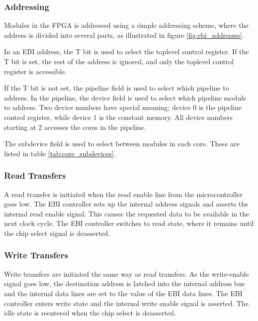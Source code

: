 

\FloatBarrier
\subsubsection{Addressing}

Modules in the FPGA is addressed using a simple addressing scheme, where the
address is divided into several parts, as illustrated in figure \ref{fig:ebi_addresses}.



In an EBI address, the T bit is used to select the toplevel control register.
If the T bit is set, the rest of the address is ignored, and only the toplevel
control register is accessible.

If the T bit is not set, the pipeline field is used to select which pipeline
to address. In the pipeline, the device field is used to select
which pipeline module to address. Two device numbers have special meaning;
device 0 is the pipeline control register, while device 1 is the constant
memory. All device numbers starting at 2 accesses the cores in the pipeline.

The subdevice field is used to select between modules in each core. These
are listed in table \ref{tab:core_subdevices}.



\FloatBarrier
\subsubsection{Read Transfers}

A read transfer is initiated when the read enable line from the microcontroller
goes low. The EBI controller sets up the internal address signals and asserts
the internal read enable signal. This causes the requested data to be available
in the next clock cycle. The EBI controller switches to read state, where it
remains until the chip select signal is deasserted.

\subsubsection{Write Transfers}

Write transfers are initiated the same way as read transfers. As the 
write-enable signal goes low, the destination address is latched into the 
internal address bus and the internal data lines are set to the value of the 
EBI data lines. The EBI controller enters write state and the internal
write enable signal is asserted. The idle state is reentered when the chip
select is deasserted.

